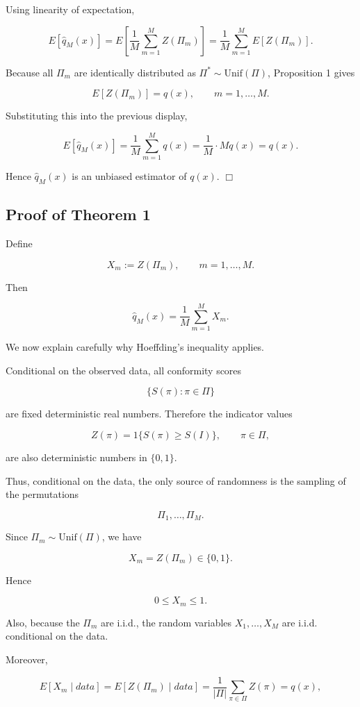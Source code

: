 \documentclass{article}
\begin{document}
Using linearity of expectation,

\[
E[\hat{q}_M(x)]
=
E\!\left[
\frac{1}{M}\sum_{m=1}^M Z(\Pi_m)
\right]
=
\frac{1}{M}\sum_{m=1}^M E[Z(\Pi_m)].
\]

Because all $\Pi_m$ are identically distributed as $\Pi^*\sim\mathrm{Unif}(\Pi)$, Proposition 1 gives

\[
E[Z(\Pi_m)]=q(x), \qquad m=1,\ldots,M.
\]

Substituting this into the previous display,

\[
E[\hat{q}_M(x)]
=
\frac{1}{M}\sum_{m=1}^M q(x)
=
\frac{1}{M}\cdot M q(x)
=
q(x).
\]

Hence $\hat{q}_M(x)$ is an unbiased estimator of $q(x)$. \hfill $\Box$

\subsection{Proof of Theorem 1}

Define

\[
X_m:=Z(\Pi_m), \qquad m=1,\ldots,M.
\]

Then

\[
\hat{q}_M(x)=\frac{1}{M}\sum_{m=1}^M X_m.
\]

We now explain carefully why Hoeffding’s inequality applies.

Conditional on the observed data, all conformity scores

\[
\{S(\pi):\pi\in\Pi\}
\]

are fixed deterministic real numbers. Therefore the indicator values

\[
Z(\pi)=1\{S(\pi)\ge S(I)\}, \qquad \pi\in\Pi,
\]

are also deterministic numbers in $\{0,1\}$.

Thus, conditional on the data, the only source of randomness is the sampling of the permutations

\[
\Pi_1,\ldots,\Pi_M.
\]

Since $\Pi_m\sim\mathrm{Unif}(\Pi)$, we have

\[
X_m=Z(\Pi_m)\in\{0,1\}.
\]

Hence

\[
0\le X_m\le 1.
\]

Also, because the $\Pi_m$ are i.i.d., the random variables $X_1,\ldots,X_M$ are i.i.d. conditional on the data.

Moreover,

\[
E[X_m\mid data]
=
E[Z(\Pi_m)\mid data]
=
\frac{1}{|\Pi|}\sum_{\pi\in\Pi} Z(\pi)
=
q(x),
\]
\end{document}
